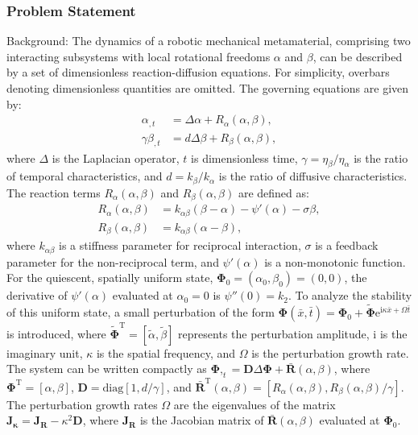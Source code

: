 \documentclass[10pt]{article}
\begin{document}
\subsubsection*{Problem Statement}
Background:
The dynamics of a robotic mechanical metamaterial, comprising two interacting subsystems with local rotational freedoms $\alpha$ and $\beta$, can be described by a set of dimensionless reaction-diffusion equations. For simplicity, overbars denoting dimensionless quantities are omitted. The governing equations are given by:
\begin{align*}
    \alpha_{,t}&=\Delta \alpha+R_\alpha(\alpha,\beta),\\
    \gamma \beta_{,t}&=d\Delta \beta+R_\beta(\alpha,\beta),
\end{align*}
where $\Delta$ is the Laplacian operator, $t$ is dimensionless time, $\gamma=\eta_\beta/\eta_\alpha$ is the ratio of temporal characteristics, and $d=k_\beta/k_\alpha$ is the ratio of diffusive characteristics. The reaction terms $R_\alpha(\alpha,\beta)$ and $R_\beta(\alpha,\beta)$ are defined as:
\begin{align*}
    R_{\alpha}(\alpha,\beta) & = k_{\alpha\beta} (\beta-\alpha)-\psi'(\alpha)-\sigma\beta,\\
    R_{\beta}(\alpha,\beta) & = k_{\alpha\beta} (\alpha-\beta),
\end{align*}
where $k_{\alpha\beta}$ is a stiffness parameter for reciprocal interaction, $\sigma$ is a feedback parameter for the non-reciprocal term, and $\psi'(\alpha)$ is a non-monotonic function. For the quiescent, spatially uniform state, $\mathbf{\Phi}_0=(\alpha_0,\beta_0)=(0,0)$, the derivative of $\psi'(\alpha)$ evaluated at $\alpha_0=0$ is $\psi''(0)=k_2$. To analyze the stability of this uniform state, a small perturbation of the form $\mathbf{\Phi}(\bar{x},\bar{t}) = \mathbf{\Phi}_0 + \tilde{\mathbf{\Phi}}\mathrm{e}^{\mathrm{i}\kappa\bar{x} + \Omega \bar{t}}$ is introduced, where $\tilde{\mathbf{\Phi}}^\mathrm{T}=[\tilde{\alpha},\tilde{\beta}]$ represents the perturbation amplitude, $\mathrm{i}$ is the imaginary unit, $\kappa$ is the spatial frequency, and $\Omega$ is the perturbation growth rate. The system can be written compactly as $\mathbf{\Phi},_{t}=\mathbf{D}\Delta\mathbf{\Phi}+\bar{\mathbf{R}}(\alpha,\beta)$, where $\mathbf{\Phi}^\mathrm{T}=[\alpha,\beta]$, $\mathbf{D}=\mathrm{diag}[1,d/\gamma]$, and $\bar{\mathbf{R}}^\mathrm{T}(\alpha,\beta)=[R_\alpha(\alpha,\beta),R_\beta(\alpha,\beta)/\gamma]$. The perturbation growth rates $\Omega$ are the eigenvalues of the matrix $\mathbf{J}_\mathbf{\kappa}=\mathbf{J}_\mathbf{R}-\kappa^2\mathbf{D}$, where $\mathbf{J}_\mathbf{R}$ is the Jacobian matrix of $\bar{\mathbf{R}}(\alpha,\beta)$ evaluated at $\mathbf{\Phi}_0$.
\end{document}

